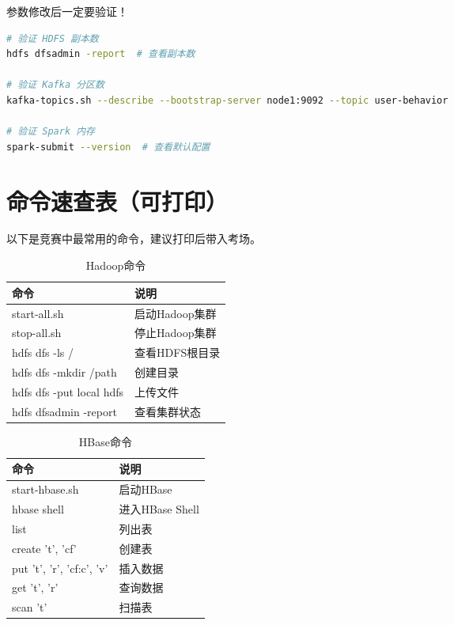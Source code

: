 \documentclass[12pt,a4paper]{article}
\begin{document}
\begin{warnbox}[考试要点]
参数修改后一定要验证！
\begin{lstlisting}[language=bash]
# 验证 HDFS 副本数
hdfs dfsadmin -report  # 查看副本数

# 验证 Kafka 分区数
kafka-topics.sh --describe --bootstrap-server node1:9092 --topic user-behavior

# 验证 Spark 内存
spark-submit --version  # 查看默认配置
\end{lstlisting}
\end{warnbox}


\section{命令速查表（可打印）}

\begin{tipbox}[考场速查提示]
以下是竞赛中最常用的命令，建议打印后带入考场。
\end{tipbox}

\begin{table}[H]
\centering
\caption{Hadoop命令}
\begin{tabular}{ll}
\toprule
\textbf{命令} & \textbf{说明} \\
\midrule
start-all.sh & 启动Hadoop集群 \\
stop-all.sh & 停止Hadoop集群 \\
hdfs dfs -ls / & 查看HDFS根目录 \\
hdfs dfs -mkdir /path & 创建目录 \\
hdfs dfs -put local hdfs & 上传文件 \\
hdfs dfsadmin -report & 查看集群状态 \\
\bottomrule
\end{tabular}
\end{table}

\begin{table}[H]
\centering
\caption{HBase命令}
\begin{tabular}{ll}
\toprule
\textbf{命令} & \textbf{说明} \\
\midrule
start-hbase.sh & 启动HBase \\
hbase shell & 进入HBase Shell \\
list & 列出表 \\
create 't', 'cf' & 创建表 \\
put 't', 'r', 'cf:c', 'v' & 插入数据 \\
get 't', 'r' & 查询数据 \\
scan 't' & 扫描表 \\
\bottomrule
\end{tabular}
\end{table}
\end{document}
